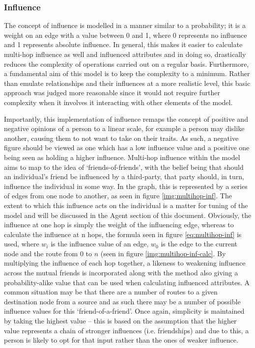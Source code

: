 \documentclass[]{report}
\begin{document}
\subsubsection{Influence}
The concept of influence is modelled in a manner similar to a probability; it is a weight on an edge with a value between 0 and 1, where 0 represents no influence and 1 represents absolute influence. In general, this makes it easier to calculate multi-hop influence as well and influenced attributes and in doing so, drastically reduces the complexity of operations carried out on a regular basis. Furthermore, a fundamental aim of this model is to keep the complexity to a minimum. Rather than emulate relationships and their influences at a more realistic level, this basic approach was judged more reasonable since it would not require further complexity when it involves it interacting with other elements of the model. 

Importantly, this implementation of influence remaps the concept of positive and negative opinions of a person to a linear scale, for example a person may dislike another, causing them to not want to take on their traits. As such, a negative figure should be viewed as one which has a low influence value and a positive one being seen as holding a higher influence.
Multi-hop influence within the model aims to map to the idea of `friends-of-friends', with the belief being that should an individual's friend be influenced by a third-party, that party should, in turn, influence the individual in some way. In the graph, this is represented by a series of edges from one node to another, as seen in figure \ref{img:multihop-inf}. The extent to which this influence acts on the individual is a matter for tuning of the model and will be discussed in the Agent section of this document. Obviously, the influence at one hop is simply the weight of the influencing edge, whereas to calculate the influence at n hops, the formula seen in figure \ref{eq:multihop-inf} is used, where $w_{i}$ is the influence value of an edge, $w_{0}$ is the edge to the current node and the route from $0$ to $n$ (seen in figure \ref{img:multihop-inf-calc}. By multiplying the influence of each hop together, a likeness to weakening influence across the mutual friends is incorporated along with the method also giving a probability-alike value that can be used when calculating influenced attributes. A common situation may be that there are a number of routes to a given destination node from a source and as such there may be a number of possible influence values for this `friend-of-a-friend'. Once again, simplicity is maintained by taking the highest value – this is based on the assumption that the higher value represents a chain of stronger influences (i.e. friendships) and due to this, a person is likely to opt for that input rather than the ones of weaker influence.
\end{document}
